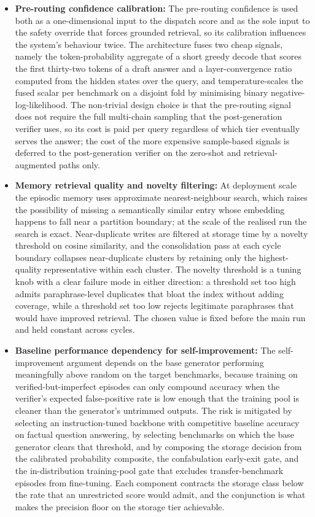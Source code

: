 \begin{itemize}
    \item \textbf{Pre-routing confidence calibration:} The pre-routing confidence is used both as a one-dimensional input to the dispatch score and as the sole input to the safety override that forces grounded retrieval, so its calibration influences the system's behaviour twice. The architecture fuses two cheap signals, namely the token-probability aggregate of a short greedy decode that scores the first thirty-two tokens of a draft answer and a layer-convergence ratio computed from the hidden states over the query, and temperature-scales the fused scalar per benchmark on a disjoint fold by minimising binary negative-log-likelihood. The non-trivial design choice is that the pre-routing signal does not require the full multi-chain sampling that the post-generation verifier uses, so its cost is paid per query regardless of which tier eventually serves the answer; the cost of the more expensive sample-based signals is deferred to the post-generation verifier on the zero-shot and retrieval-augmented paths only.

    \item \textbf{Memory retrieval quality and novelty filtering:} At deployment scale the episodic memory uses approximate nearest-neighbour search, which raises the possibility of missing a semantically similar entry whose embedding happens to fall near a partition boundary; at the scale of the realised run the search is exact. Near-duplicate writes are filtered at storage time by a novelty threshold on cosine similarity, and the consolidation pass at each cycle boundary collapses near-duplicate clusters by retaining only the highest-quality representative within each cluster. The novelty threshold is a tuning knob with a clear failure mode in either direction: a threshold set too high admits paraphrase-level duplicates that bloat the index without adding coverage, while a threshold set too low rejects legitimate paraphrases that would have improved retrieval. The chosen value is fixed before the main run and held constant across cycles.

    \item \textbf{Baseline performance dependency for self-improvement:} The self-improvement argument depends on the base generator performing meaningfully above random on the target benchmarks, because training on verified-but-imperfect episodes can only compound accuracy when the verifier's expected false-positive rate is low enough that the training pool is cleaner than the generator's untrimmed outputs. The risk is mitigated by selecting an instruction-tuned backbone with competitive baseline accuracy on factual question answering, by selecting benchmarks on which the base generator clears that threshold, and by composing the storage decision from the calibrated probability composite, the confabulation early-exit gate, and the in-distribution training-pool gate that excludes transfer-benchmark episodes from fine-tuning. Each component contracts the storage class below the rate that an unrestricted score would admit, and the conjunction is what makes the precision floor on the storage tier achievable.


\end{itemize}
